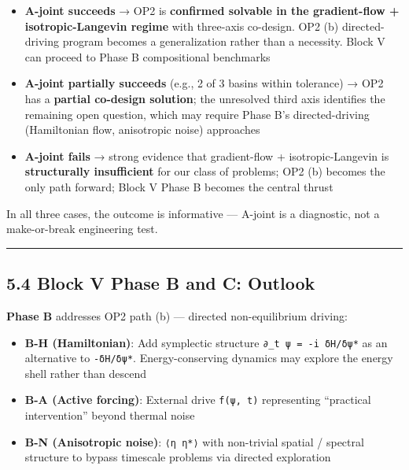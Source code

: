 \documentclass[
]{article}
\providecommand{\tightlist}{%
  \setlength{\itemsep}{0pt}\setlength{\parskip}{0pt}}
\begin{document}
\begin{itemize}
\tightlist
\item
  \textbf{A-joint succeeds} → OP2 is \textbf{confirmed solvable in the
  gradient-flow + isotropic-Langevin regime} with three-axis co-design.
  OP2 (b) directed-driving program becomes a generalization rather than
  a necessity. Block V can proceed to Phase B compositional benchmarks
\item
  \textbf{A-joint partially succeeds} (e.g., 2 of 3 basins within
  tolerance) → OP2 has a \textbf{partial co-design solution}; the
  unresolved third axis identifies the remaining open question, which
  may require Phase B's directed-driving (Hamiltonian flow, anisotropic
  noise) approaches
\item
  \textbf{A-joint fails} → strong evidence that gradient-flow +
  isotropic-Langevin is \textbf{structurally insufficient} for our class
  of problems; OP2 (b) becomes the only path forward; Block V Phase B
  becomes the central thrust
\end{itemize}

In all three cases, the outcome is informative --- A-joint is a
diagnostic, not a make-or-break engineering test.

\begin{center}\rule{0.5\linewidth}{0.5pt}\end{center}

\hypertarget{block-v-phase-b-and-c-outlook}{%
\subsection{5.4 Block V Phase B and C:
Outlook}\label{block-v-phase-b-and-c-outlook}}

\textbf{Phase B} addresses OP2 path (b) --- directed non-equilibrium
driving:

\begin{itemize}
\tightlist
\item
  \textbf{B-H (Hamiltonian)}: Add symplectic structure
  \texttt{∂\_t\ ψ\ =\ -i\ δH/δψ*} as an alternative to \texttt{-δH/δψ*}.
  Energy-conserving dynamics may explore the energy shell rather than
  descend
\item
  \textbf{B-A (Active forcing)}: External drive \texttt{f(ψ,\ t)}
  representing ``practical intervention'' beyond thermal noise
\item
  \textbf{B-N (Anisotropic noise)}: \texttt{⟨η\ η*⟩} with non-trivial
  spatial / spectral structure to bypass timescale problems via directed
  exploration
\end{itemize}
\end{document}
